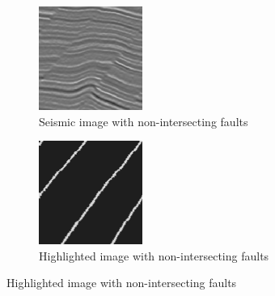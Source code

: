 \documentclass[preprint,12pt]{elsarticle}
\begin{document}
\begin{figure}
    \centering
    \begin{subfigure}[b]{.3\textwidth}
        \includegraphics[width=\textwidth]{images/seismic_non_intersecting.png}
        \caption{Seismic image with non-intersecting faults}
        \label{subfig:non_intersecting_faults}
    \end{subfigure}
    \begin{subfigure}[b]{.3\textwidth}
        \includegraphics[width=\textwidth]{images/highlighted_non_intersecting.png}
        \caption{Highlighted image with non-intersecting faults}
        \label{subfig:highlighted_non_faults}
    \end{subfigure}
\end{figure}
\end{document}
